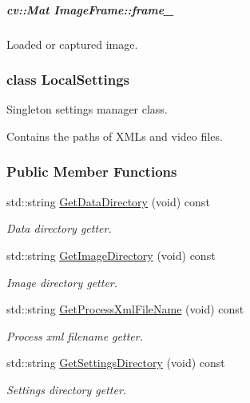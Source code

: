 \hypertarget{group___core_a6aaede1e96c67711280696df991b4508}{
\subparagraph[{frame\-\_\-}]{\setlength{\rightskip}{0pt plus 5cm}cv\-::\-Mat Image\-Frame\-::frame\-\_\-\hspace{0.3cm}{\ttfamily [private]}}}\label{group___core_a6aaede1e96c67711280696df991b4508}


Loaded or captured image. 

\label{class_local_settings}
\hypertarget{group___core_class_local_settings}{}
\subsubsection{class Local\-Settings}
Singleton settings manager class. 

Contains the paths of X\-M\-Ls and video files. \subsubsection*{Public Member Functions}
\begin{DoxyCompactItemize}
\item 
std\-::string \hyperlink{group___core_aaa62a3ad7984bb9b41d874a432f80eb5}{Get\-Data\-Directory} (void) const 
\begin{DoxyCompactList}\small\item\em Data directory getter. \end{DoxyCompactList}\item 
std\-::string \hyperlink{group___core_abbaecb0ce832b89c7851af0d7931cf89}{Get\-Image\-Directory} (void) const 
\begin{DoxyCompactList}\small\item\em Image directory getter. \end{DoxyCompactList}\item 
std\-::string \hyperlink{group___core_a2ab12f5691406aa7ad21140fd3a94f27}{Get\-Process\-Xml\-File\-Name} (void) const 
\begin{DoxyCompactList}\small\item\em Process xml filename getter. \end{DoxyCompactList}\item 
std\-::string \hyperlink{group___core_adfd6c887c7c35c76bce216dda592170d}{Get\-Settings\-Directory} (void) const 
\begin{DoxyCompactList}\small\item\em Settings directory getter. \end{DoxyCompactList}\end{DoxyCompactItemize}
